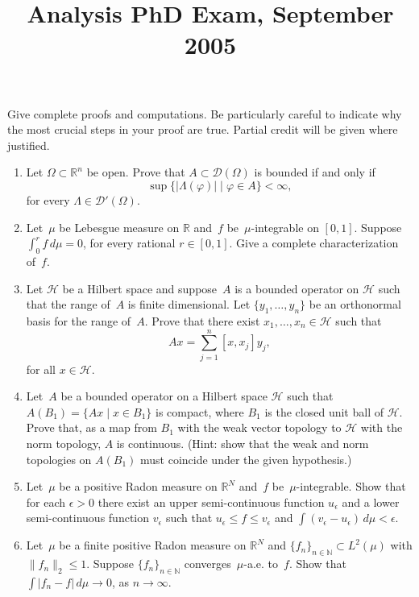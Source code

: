 \documentclass[11pt,letterpaper]{article}
\title{Analysis PhD Exam, September 2005}
\author{}
\date{}
\newenvironment{examproblems}[2]{%
  \def\ProblemHeadingTag{#2}%
  \AssignTaggingSocketPlug{block/list/label}{examproblem}%
  \begin{enumerate}%
  \setcounter{enumi}{#1}%
  \renewcommand{\labelenumi}{\textbf{\theenumi.}}%
  \setlength{\topsep}{0.35em}%
  \setlength{\partopsep}{0pt}%
  \setlength{\itemsep}{0.48em}%
  \setlength{\parsep}{0.18em}%
}{\end{enumerate}}
\newenvironment{examinstructions}{%
  \par\begingroup\itshape
}{%
  \par\endgroup\vspace{0.18em}
}
\begin{document}
\maketitle
\thispagestyle{empty}
\begin{examinstructions}
Give complete proofs and computations. Be particularly careful to indicate why the most crucial steps in your proof are true. Partial credit will be given where justified.
\end{examinstructions}
\begin{examproblems}{0}{H2}
\def\ProblemHeadingText{Problem 1.}
\item
Let \(\Omega\subset\mathbb R^n\) be open. Prove that \(A\subset\mathcal D(\Omega)\) is bounded if and only if
\[
\sup\{|\Lambda(\varphi)|\mid \varphi\in A\}<\infty,
\]
 for every \(\Lambda\in\mathcal D'(\Omega)\).
\def\ProblemHeadingText{Problem 2.}
\item
Let~\(\mu\) be Lebesgue measure on \(\mathbb R\) and~\(f\) be~\(\mu\)-integrable on \([0,1]\). Suppose \(\int_0^r f\,d\mu=0\), for every rational \(r\in[0,1]\). Give a complete characterization of~\(f\).
\def\ProblemHeadingText{Problem 3.}
\item
Let \(\mathcal H\) be a Hilbert space and suppose~\(A\) is a bounded operator on \(\mathcal H\) such that the range of~\(A\) is finite dimensional. Let \(\{y_1,\ldots,y_n\}\) be an orthonormal basis for the range of~\(A\). Prove that there exist \(x_1,\ldots,x_n\in\mathcal H\) such that
\[
Ax=\sum_{j=1}^n[x,x_j]y_j,
\]
 for all \(x\in\mathcal H\).
\def\ProblemHeadingText{Problem 4.}
\item
Let~\(A\) be a bounded operator on a Hilbert space \(\mathcal H\) such that \(A(B_1)=\{Ax\mid x\in B_1\}\) is compact, where \(B_1\) is the closed unit ball of \(\mathcal H\). Prove that, as a map from \(B_1\) with the weak vector topology to \(\mathcal H\) with the norm topology, \(A\) is continuous. (Hint: show that the weak and norm topologies on \(A(B_1)\) must coincide under the given hypothesis.)
\def\ProblemHeadingText{Problem 5.}
\item
Let~\(\mu\) be a positive Radon measure on \(\mathbb R^N\) and~\(f\) be~\(\mu\)-integrable. Show that for each \(\epsilon>0\) there exist an upper semi-continuous function \(u_\epsilon\) and a lower semi-continuous function \(v_\epsilon\) such that \(u_\epsilon\leq f\leq v_\epsilon\) and \(\int(v_\epsilon-u_\epsilon)\,d\mu<\epsilon\).
\def\ProblemHeadingText{Problem 6.}
\item
Let~\(\mu\) be a finite positive Radon measure on \(\mathbb R^N\) and \(\{f_n\}_{n\in\mathbb N}\subset L^2(\mu)\) with \(\|f_n\|_2\leq1\). Suppose \(\{f_n\}_{n\in\mathbb N}\) converges~\(\mu\)-a.e. to~\(f\). Show that \(\int|f_n-f|\,d\mu\to0\), as \(n\to\infty\).

\end{examproblems}
\end{document}
